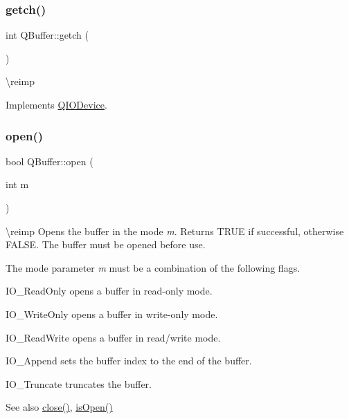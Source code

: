 \subsubsection{\texorpdfstring{getch()}{getch()}}
{\footnotesize\ttfamily int Q\+Buffer\+::getch (\begin{DoxyParamCaption}{ }\end{DoxyParamCaption})\hspace{0.3cm}{\ttfamily [virtual]}}

\textbackslash{}reimp 

Implements \mbox{\hyperlink{class_q_i_o_device_a7cef61d66023f9cda6b0912082bd19fc}{Q\+I\+O\+Device}}.

\mbox{\label{class_q_buffer_aa3ceff2217a13a570e0dcec157b23b18}} 
\subsubsection{\texorpdfstring{open()}{open()}}
{\footnotesize\ttfamily bool Q\+Buffer\+::open (\begin{DoxyParamCaption}\item[{int}]{m }\end{DoxyParamCaption})\hspace{0.3cm}{\ttfamily [virtual]}}

\textbackslash{}reimp Opens the buffer in the mode {\itshape m}. Returns T\+R\+UE if successful, otherwise F\+A\+L\+SE. The buffer must be opened before use.

The mode parameter {\itshape m} must be a combination of the following flags. 
\begin{DoxyItemize}
\item {\ttfamily I\+O\+\_\+\+Read\+Only} opens a buffer in read-\/only mode. 
\item {\ttfamily I\+O\+\_\+\+Write\+Only} opens a buffer in write-\/only mode. 
\item {\ttfamily I\+O\+\_\+\+Read\+Write} opens a buffer in read/write mode. 
\item {\ttfamily I\+O\+\_\+\+Append} sets the buffer index to the end of the buffer. 
\item {\ttfamily I\+O\+\_\+\+Truncate} truncates the buffer. 
\end{DoxyItemize}

\begin{DoxySeeAlso}{See also}
\mbox{\hyperlink{class_q_buffer_affd0b382476516b0d4e3adfaf27c0247}{close()}}, \mbox{\hyperlink{class_q_i_o_device_a291d97cdb38c1cd261bfbaa67a9d3923}{is\+Open()}} 
\end{DoxySeeAlso}


